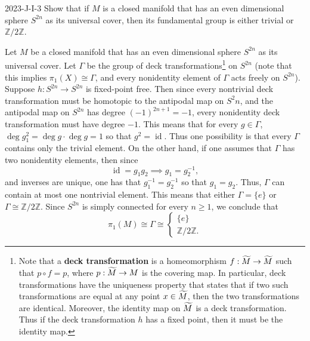 \documentclass{article}
\begin{document}
	\begin{prb}{2023-J-I-3}
		Show that if $M$ is a closed manifold that has an even dimensional sphere $S^{2n}$ as its universal cover, then its fundamental group is either trivial or $\mathbb{Z}/2\mathbb{Z}$. 
	\end{prb}
	Let $M$ be a closed manifold that has an even dimensional sphere $S^{2n}$ as its universal cover. Let $\Gamma$ be the group of deck transformations\footnote{Note that a \textbf{deck transformation} is a homeomorphism $f: \widetilde{M} \to \widetilde{M}$ such that $p \circ f = p$, where $p: \widetilde{M} \to M$ is the covering map. In particular, deck transformations have the uniqueness property that states that if two such transformations are equal at any point $x \in \widetilde{M}$, then the two transformations are identical. Moreover, the identity map on $\widetilde{M}$ is a deck transformation. Thus if the deck transformation $h$ has a fixed point, then it must be the identity map.} on $S^{2n}$ (note that this implies $\pi_1(X) \cong \Gamma$, and every nonidentity element of $\Gamma$ acts freely on $S^{2n}$). Suppose $h: S^{2n} \to S^{2n}$ is fixed-point free. Then since every nontrivial deck transformation must be homotopic to the antipodal map on $S^2n$, and the antipodal map on $S^{2n}$ has degree $(-1)^{2n + 1} = -1$, every nonidentity deck transformation must have degree $-1$. This means that for every $g \in \Gamma$, $\deg{g_1^2} = \deg{g}\cdot \deg{g} = 1$ so that $g^2 = \operatorname{id}$. Thus one possibility is that every $\Gamma$ contains only the trivial element. On the other hand, if one assumes that $\Gamma$ has two nonidentity elements, then since 
	\begin{equation*}
		\operatorname{id} = g_1g_2 \implies g_1 = g_2^{-1}, 
	\end{equation*}
	and inverses are unique, one has that $g_{1}^{-1} = g_{2}^{-1}$ so that $g_1 = g_2$. Thus, $\Gamma$ can contain at most one nontrivial element. This means that either $\Gamma = \{e\}$ or $\Gamma \cong \mathbb{Z}/2\mathbb{Z}$. Since $S^{2n}$ is simply connected for every $n \geq 1$, we conclude that 
	\begin{equation*}
		\pi_{1}(M) \cong \Gamma \cong 
		\begin{cases}
			\{e\} \\
			\mathbb{Z}/2\mathbb{Z}. 
		\end{cases}
	\end{equation*}
	
\end{document}
